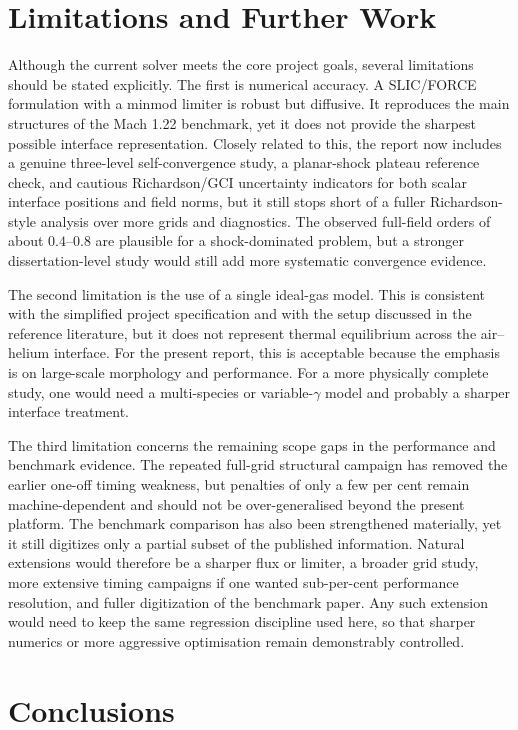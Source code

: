 \documentclass[final,3p,times,twocolumn]{elsarticle}
\begin{document}
\section{Limitations and Further Work}

Although the current solver meets the core project goals, several limitations should be stated explicitly. The first is numerical accuracy. A SLIC/FORCE formulation with a minmod limiter is robust but diffusive. It reproduces the main structures of the Mach 1.22 benchmark, yet it does not provide the sharpest possible interface representation. Closely related to this, the report now includes a genuine three-level self-convergence study, a planar-shock plateau reference check, and cautious Richardson/GCI uncertainty indicators for both scalar interface positions and field norms, but it still stops short of a fuller Richardson-style analysis over more grids and diagnostics. The observed full-field orders of about $0.4$--$0.8$ are plausible for a shock-dominated problem, but a stronger dissertation-level study would still add more systematic convergence evidence.

The second limitation is the use of a single ideal-gas model. This is consistent with the simplified project specification and with the setup discussed in the reference literature, but it does not represent thermal equilibrium across the air--helium interface. For the present report, this is acceptable because the emphasis is on large-scale morphology and performance. For a more physically complete study, one would need a multi-species or variable-$\gamma$ model and probably a sharper interface treatment.

The third limitation concerns the remaining scope gaps in the performance and benchmark evidence. The repeated full-grid structural campaign has removed the earlier one-off timing weakness, but penalties of only a few per cent remain machine-dependent and should not be over-generalised beyond the present platform. The benchmark comparison has also been strengthened materially, yet it still digitizes only a partial subset of the published information. Natural extensions would therefore be a sharper flux or limiter, a broader grid study, more extensive timing campaigns if one wanted sub-per-cent performance resolution, and fuller digitization of the benchmark paper. Any such extension would need to keep the same regression discipline used here, so that sharper numerics or more aggressive optimisation remain demonstrably controlled.

\section{Conclusions}
\end{document}
